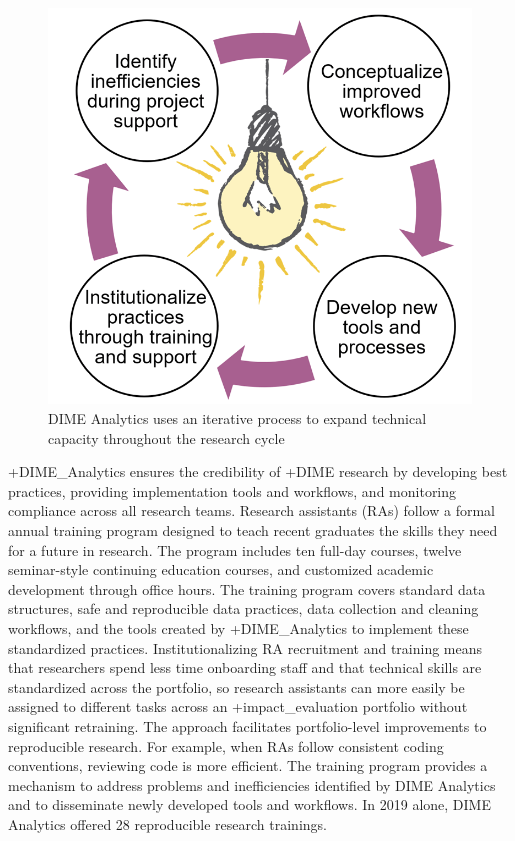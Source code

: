 \documentclass[
]{book}
\begin{document}
\begin{figure}
\includegraphics[width=1\linewidth]{./assets/dime/dimefigure3web} \caption{DIME Analytics uses an iterative process to expand technical capacity throughout the research cycle}\label{fig:dimefigure3}
\end{figure}

+DIME\_Analytics\textbar{} ensures the credibility of +DIME\textbar{} research by developing best practices, providing implementation tools and workflows, and monitoring compliance across all research teams. Research assistants (RAs) follow a formal annual training program designed to teach recent graduates the skills they need for a future in research. The program includes ten full-day courses, twelve seminar-style continuing education courses, and customized academic development through office hours. The training program covers standard data structures, safe and reproducible data practices, data collection and cleaning workflows, and the tools created by +DIME\_Analytics\textbar{} to implement these standardized practices. Institutionalizing RA recruitment and training means that researchers spend less time onboarding staff and that technical skills are standardized across the portfolio, so research assistants can more easily be assigned to different tasks across an +impact\_evaluation\textbar{} portfolio without significant retraining. The approach facilitates portfolio-level improvements to reproducible research. For example, when RAs follow consistent coding conventions, reviewing code is more efficient. The training program provides a mechanism to address problems and inefficiencies identified by DIME Analytics and to disseminate newly developed tools and workflows. In 2019 alone, DIME Analytics offered 28 reproducible research trainings.
\end{document}
